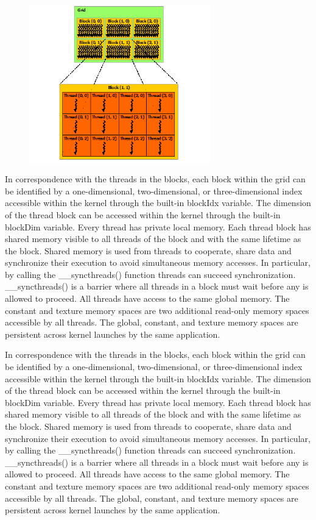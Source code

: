  \begin{figure}[H]
    \centering
        \includegraphics[totalheight=0.5\textheight,width=0.7\textwidth]{blocks.png}
    \caption{}
    \label{fig:warp_scheduler}
\end{figure}


In correspondence with the threads in the blocks, each block within the grid can be identified by a one-dimensional, two-dimensional, or three-dimensional index accessible within the kernel through the built-in blockIdx variable. The dimension of the thread block can be accessed within the kernel through the built-in blockDim variable. 
Every thread has private local memory. Each thread block has shared memory visible to all threads of the block and with the same lifetime as the block. Shared memory is used from threads to cooperate, share data and synchronize their execution to avoid simultaneous memory accesses. In particular, by calling the \_\_syncthreads() function threads can succeed synchronization.  \_\_syncthreads() is a barrier where all threads in a block must wait before any is allowed to proceed. All threads have access to the same global memory. The constant and texture memory spaces are two additional read-only memory spaces accessible by all threads. The global, constant, and texture memory spaces are persistent across kernel launches by the same application. 


In correspondence with the threads in the blocks, each block within the grid can be identified by a one-dimensional, two-dimensional, or three-dimensional index accessible within the kernel through the built-in blockIdx variable. The dimension of the thread block can be accessed within the kernel through the built-in blockDim variable. Every thread has private local memory. Each thread block has shared memory visible to all threads of the block and with the same lifetime as the block. Shared memory is used from threads to cooperate, share data and synchronize their execution to avoid simultaneous memory accesses. In particular, by calling the \_\_syncthreads() function threads can succeed  synchronization. \_\_syncthreads() is a barrier where all threads in a block must wait before any is allowed to proceed. All threads have access to the same global memory. The constant and texture memory spaces are two additional read-only memory spaces accessible by all threads. The global, constant, and texture memory spaces are persistent across kernel launches by the same application. 

